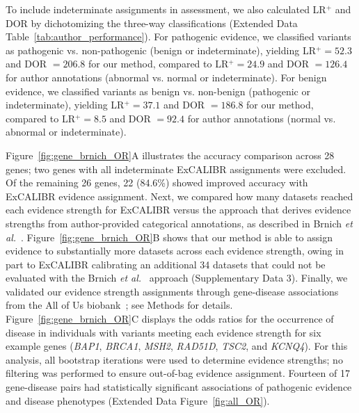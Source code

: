 \documentclass[11pt]{article}
\theoremstyle{plain}
\newcommand{\NumAuthorAnnotatedGenes}{28 }
\newcommand{\NumAuthorAnnotatedGenesDeterminate}{26 }
\newcommand{\NumDatasetsBrnichNA}{34 }
\newcommand{\excalibr}{ExCALIBR\xspace}
\begin{document}
To include indeterminate assignments in assessment, we also calculated LR$^+$ and DOR by dichotomizing the three-way classifications (Extended Data Table~\ref{tab:author_performance}). For pathogenic evidence, we classified variants as pathogenic vs. non-pathogenic (benign or indeterminate), yielding LR$^+ = 52.3$ and DOR $= 206.8$ for our method, compared to LR$^+ = 24.9$ and DOR $= 126.4$ for author annotations (abnormal vs. normal or indeterminate). For benign evidence, we classified variants as benign vs. non-benign (pathogenic or indeterminate), yielding LR$^+ = 37.1$ and DOR $= 186.8$ for our method, compared to LR$^+ = 8.5$ and DOR $= 92.4$ for author annotations (normal vs. abnormal or indeterminate).

Figure~\ref{fig:gene_brnich_OR}A illustrates the accuracy comparison across \NumAuthorAnnotatedGenes genes; two genes with all indeterminate \excalibr assignments were excluded. Of the remaining \NumAuthorAnnotatedGenesDeterminate genes, 22 (84.6\%) showed improved accuracy with \excalibr evidence assignment. Next, we compared how many datasets reached each evidence strength for \excalibr versus the %
approach that derives evidence strengths from author-provided categorical annotations, as described in Brnich \textit{et al.}~\cite{brnich2020recommendations}. Figure~\ref{fig:gene_brnich_OR}B shows that our method is able to assign evidence to substantially more datasets across each evidence strength, owing in part to \excalibr calibrating an additional \NumDatasetsBrnichNA datasets that could not be evaluated with the Brnich \textit{et al.}~\cite{brnich2020recommendations} approach (Supplementary Data 3). Finally, we validated our evidence strength assignments through gene-disease associations from the All of Us biobank~\cite{AllofUs2019}; see Methods for details. Figure~\ref{fig:gene_brnich_OR}C displays the odds ratios for the occurrence of disease in individuals with variants meeting each evidence strength for six example genes (\textit{BAP1}, \textit{BRCA1}, \textit{MSH2}, \textit{RAD51D}, \textit{TSC2}, and \textit{KCNQ4}). For this analysis, all bootstrap iterations were used to determine evidence strengths; no filtering was performed to ensure out-of-bag evidence assignment. Fourteen of 17 gene-disease pairs had statistically significant associations of pathogenic evidence and disease phenotypes (Extended Data Figure~\ref{fig:all_OR}).
\end{document}
